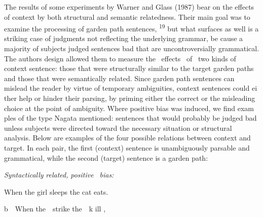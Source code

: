 \begin{styleStandard}
The results of some experiments by Warner and Glass (1987) bear on the effects of context by both structural and semantic relatedness. Their main goal was to examine the processing of garden path sentences, \textsuperscript{19 }but what surfaces as well is a striking case of judgments not reflecting the underlying grammar, be\- cause a majority of subjects judged sentences bad that are uncontroversially grammatical. The authors{\textquotesingle} design allowed them to measure the \ effects \ of \ two kinds of context sentence: those that were structurally similar to the target garden paths and those that were semantically related. Since garden path sentences can mislead the reader by virtue of temporary ambiguities, context sentences could ei\- ther help or hinder their parsing, by priming either the correct or the misleading choice at the point of ambiguity. Where positive bias was induced, we find exam\- ples of the type Nagata mentioned: sentences that would probably be judged bad unless subjects were directed toward the necessary situation or structural analysis. Below are examples of the four possible relations between context and target. In each pair, the first (context) sentence is unambiguously parsable and grammatical, while the second (target) sentence is a garden path:
\end{styleStandard}


\setcounter{listWWNumxxviileveli}{15}
\begin{listWWNumxxviileveli}
\item 
\begin{styleStandard}
\textit{Syntactically}\textit{ }\textit{related,}\textit{ }\textit{positive }\textit{\ }\textit{bias:}
\end{styleStandard}


\setcounter{listWWNumxxviilevelii}{0}
\begin{listWWNumxxviilevelii}
\item 
\begin{styleStandard}
When the girl sleeps the cat eats.
\end{styleStandard}


\end{listWWNumxxviilevelii}
\end{listWWNumxxviileveli}
\begin{styleStandard}
b\ \ When the\ \ strike the\ \ k ill ,
\end{styleStandard}


